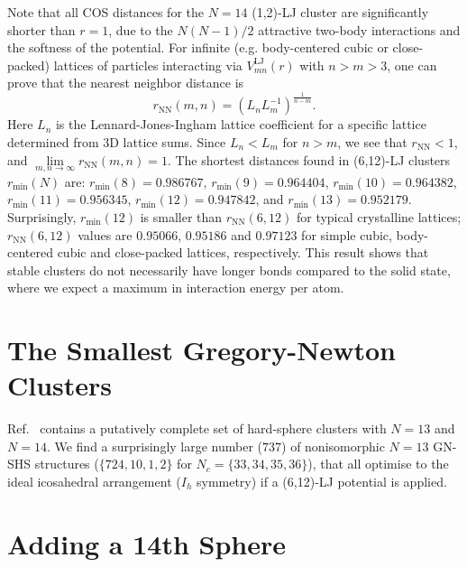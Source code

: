 Note that all \ac{COS} distances for the $N=14$ (1,2)-\ac{LJ} cluster are
significantly shorter than $r=1$, due to the $N(N-1)/2$ attractive two-body
interactions and the softness of the potential.  For infinite (e.g.
body-centered cubic or close-packed) lattices of particles interacting via
$V^\mathrm{LJ}_{mn}(r)$ with $n> m >3$, one can prove
\autocite{schwerdtfeger_extension_2006} that the nearest neighbor distance is
%
\begin{equation}
    r_\mathrm{NN}(m,n)=\left( L_n L_m^{-1}\right)^\frac{1}{n-m}. %
    \label{eqn:lattice}
\end{equation}%
%
Here $L_n$ is the Lennard-Jones-Ingham lattice coefficient for a specific
lattice determined from 3D lattice sums.  Since $L_n<L_m$ for $n>m$, we see
that $r_\mathrm{NN}<1$, and $\lim\limits_{m,n\rightarrow
\infty}r_\mathrm{NN}(m,n)=1$.  The shortest distances found in (6,12)-\ac{LJ}
clusters $r_\text{min}(N)$ are: $r_\text{min}(8)=0.986767$,
$r_\text{min}(9)=0.964404$, $r_\text{min}(10)=0.964382$,
$r_\text{min}(11)=0.956345$, $r_\text{min}(12)=0.947842$, and
$r_\text{min}(13)=0.952179$.  Surprisingly, $r_\text{min}(12)$ is smaller than
$r_\mathrm{NN}(6,12)$ for typical crystalline lattices; $r_\mathrm{NN}(6,12)$
values are $0.95066$, $0.95186$ and $0.97123$ for simple cubic, body-centered
cubic and close-packed lattices, respectively.  This result shows that stable
clusters do not necessarily have longer bonds compared to the solid state,
where we expect a maximum in interaction energy per atom.


\section{The Smallest Gregory-Newton Clusters}
\label{sec:themsmallestgregorynewtonclusters}

Ref.~\cite{holmes-cerfon_enumerating_2016} contains a putatively complete set
of hard-sphere clusters with $N=13$ and $N=14$.  We find a surprisingly large
number ($737$) of nonisomorphic $N = 13$ \ac{GN}-\ac{SHS} structures ($\{724,10,1,2\}$
for $N_c=\{33,34,35,36\}$), that all optimise to the ideal icosahedral
arrangement ($I_h$ symmetry) if a (6,12)-\ac{LJ} potential is applied.

\section{Adding a 14th Sphere}
\label{sec:addinga14thsphere}


